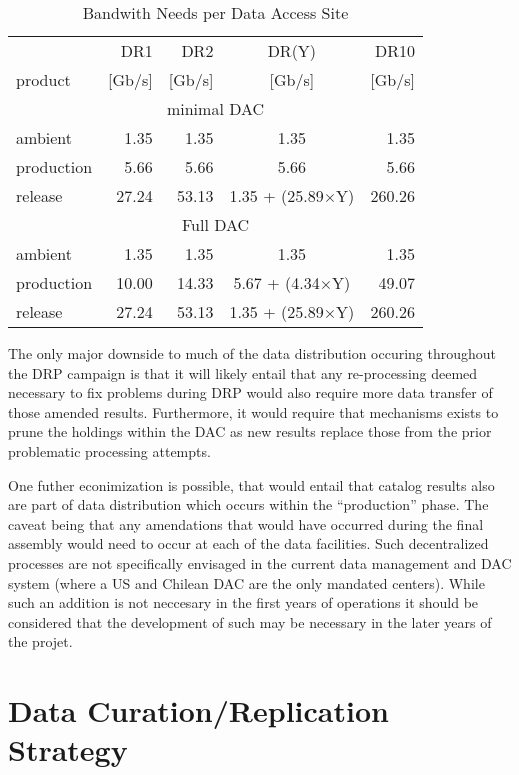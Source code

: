 \begin{table}[!ht]
\caption{Bandwith Needs per Data Access Site} 
\label{tab_rate}
\footnotesize
\centering
\begin{tabular}[]{|l|rrcr|}
\hline
\hline
            &   DR1   &  DR2   &  DR(Y)  &  DR10 \\
 product    &  [Gb/s] & [Gb/s] &  [Gb/s] & [Gb/s] \\
\hline
\multicolumn{5}{c}{minimal DAC} \\
\hline
 ambient    &  1.35  &  1.35  &  1.35      &  1.35  \\
 production &  5.66  &  5.66  &  5.66      &  5.66  \\
 release    & 27.24  & 53.13  &  1.35 + (25.89$\times$Y) & 260.26 \\
\hline
\multicolumn{5}{c}{Full DAC} \\
\hline
 ambient    &  1.35  &  1.35  &  1.35      &  1.35  \\
 production & 10.00  & 14.33  &  5.67 + (4.34$\times$Y) &  49.07 \\
 release    & 27.24  & 53.13  &  1.35 + (25.89$\times$Y) & 260.26 \\
\hline
\end{tabular}
\end{table}

The only major downside to much of the data distribution occuring throughout the DRP campaign is 
that it will likely entail that any re-processing deemed necessary to fix problems during DRP 
would also require more data transfer of those amended results.  Furthermore, it would require 
that mechanisms exists to prune the holdings within the DAC as new results replace those from the 
prior problematic processing attempts.  

One futher econimization is possible, that would entail that catalog results also are part 
of data distribution which occurs within the ``production'' phase.  The caveat being that any 
amendations that would have occurred during the final assembly would need to occur at each of 
the data facilities.  Such decentralized processes are not specifically envisaged in the 
current data management and DAC system (where a US and Chilean DAC are the only mandated centers).
While such an addition is not neccesary in the first years of operations it should be considered 
that the development of such may be necessary in the later years of the projet.


\section{Data Curation/Replication Strategy\label{sec_method}}

